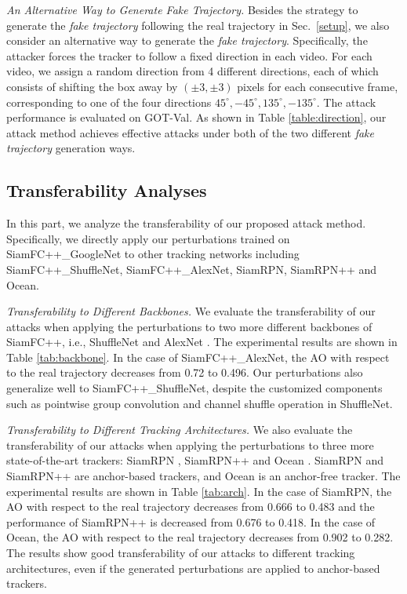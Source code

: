 \documentclass[journal]{IEEEtran}
\newcommand{\ie}{i.e.}
\renewcommand{\uline}{}
\begin{document}
\textit{An Alternative Way to Generate Fake Trajectory.} Besides the strategy to generate the \textit{fake trajectory} following the real trajectory in Sec.~\ref{setup}, we also consider an alternative way to generate the \textit{fake trajectory}. Specifically, the attacker forces the tracker to follow a fixed direction in each video. For \uline{each video}, we assign a random direction from 4 different directions, each of which consists of shifting the box away by $(\pm 3, \pm 3)$ pixels for each consecutive frame, corresponding to one of the four directions $45^{\circ}, -45^{\circ}, 135^{\circ}, -135^{\circ}$. The attack performance is evaluated on GOT-Val. As shown in Table \ref{table:direction}, our attack method achieves effective attacks under both of the two different \uline{\textit{fake trajectory}} generation ways.

\subsection{Transferability Analyses}

In this part, we analyze the transferability of our proposed attack method. Specifically, we directly apply our perturbations trained on SiamFC++\_GoogleNet to other tracking networks including SiamFC++\_ShuffleNet, SiamFC++\_AlexNet, SiamRPN, SiamRPN++ and Ocean.


\textit{Transferability to Different Backbones.} We evaluate the transferability of our attacks when applying the perturbations to two more different backbones of SiamFC++, \ie, ShuffleNet \cite{ShuffleNet} and AlexNet \cite{AlexNet}.
The experimental results are shown in Table \ref{tab:backbone}. In the case of SiamFC++\_AlexNet, the AO with respect to the real trajectory decreases from 0.72 to 0.496. Our perturbations also generalize well to SiamFC++\_ShuffleNet, despite the customized components such as pointwise group convolution and channel shuffle operation in ShuffleNet.

\textit{Transferability to Different Tracking Architectures.} We also evaluate the transferability of our attacks when applying the perturbations to three more state-of-the-art trackers: SiamRPN \cite{SiamRPN}, SiamRPN++ \cite{SiamRPN++} and Ocean \cite{zhang2020ocean}. SiamRPN and SiamRPN++ are anchor-based trackers, and Ocean is an anchor-free tracker. The experimental results are shown in Table \ref{tab:arch}. In the case of SiamRPN, the AO with respect to the real trajectory decreases from 0.666 to 0.483 and the performance of SiamRPN++ is decreased from 0.676 to 0.418. In the case of Ocean, the AO with respect to the real trajectory decreases from 0.902 to 0.282. The results show good transferability of our attacks to different tracking architectures, even if the generated perturbations are applied to anchor-based trackers.
\end{document}
